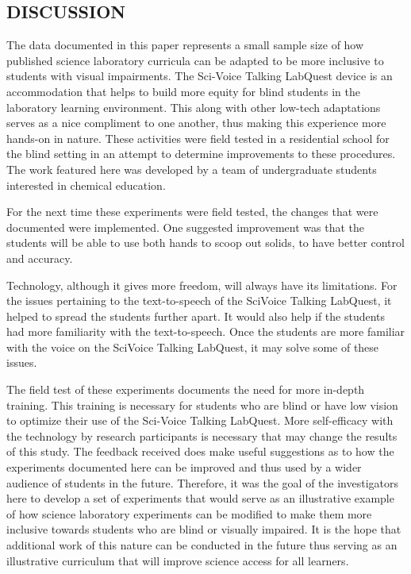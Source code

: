 \documentclass[11.5pt]{sig-alternate} %
\begin{document}
\begin{large}
\section*{DISCUSSION}

The data documented in this paper represents a small sample size of how published science laboratory curricula can be adapted to be more inclusive to students with visual impairments. The Sci-Voice Talking LabQuest device is an accommodation that helps to build more equity for blind students in the laboratory learning environment. This along with other low-tech adaptations serves as a nice compliment to one another, thus making this experience more hands-on in nature. These activities were field tested in a residential school for the blind setting in an attempt to determine improvements to these procedures. The work featured here was developed by a team of undergraduate students interested in chemical education. 

For the next time these experiments were field tested, the changes that were documented were implemented. One suggested improvement was that the students will be able to use both hands to scoop out solids, to have better control and accuracy. 

Technology, although it gives more freedom, will always have its limitations. For the issues pertaining to the text-to-speech of the SciVoice Talking LabQuest, it helped to spread the students further apart. It would also help if the students had more familiarity with the text-to-speech. Once the students are more familiar with the voice on the SciVoice Talking LabQuest, it may solve some of these issues. 

The field test of these experiments documents the need for more in-depth training. This training is necessary for students who are blind or have low vision to optimize their use of the Sci-Voice Talking LabQuest. More self-efficacy with the technology by research participants is necessary that may change the results of this study. The feedback received does make useful suggestions as to how the experiments documented here can be improved and thus used by a wider audience of students in the future. Therefore, it was the goal of the investigators here to develop a set of experiments that would serve as an illustrative example of how science laboratory experiments can be modified to make them more inclusive towards students who are blind or visually impaired. It is the hope that additional work of this nature can be conducted in the future thus serving as an illustrative curriculum that will improve science access for all learners.


\end{large}
\end{document}
